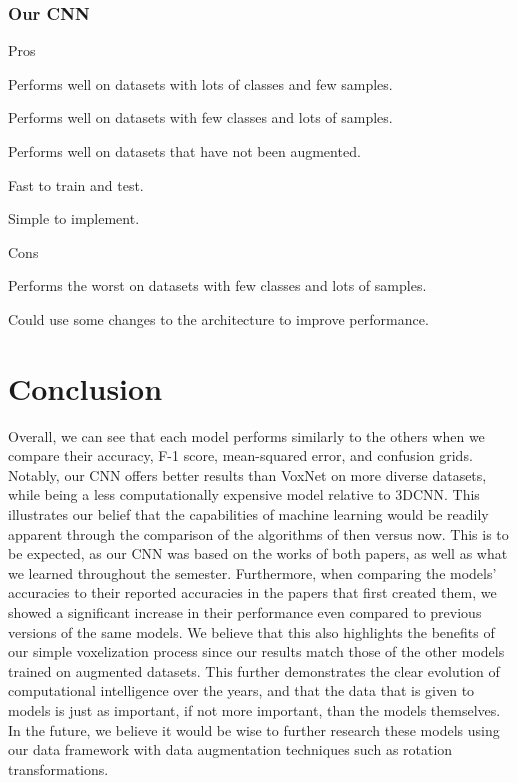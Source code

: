 \documentclass[conference]{IEEEtran}
\begin{document}
\subsubsection{Our CNN}
\begin{list}{}{\leftmargin=1em}
    \item Pros
    \begin{list}{}{\leftmargin=1em}
        \item Performs well on datasets with lots of classes and few samples.
        \item Performs well on datasets with few classes and lots of samples.
        \item Performs well on datasets that have not been augmented.
        \item Fast to train and test.
        \item Simple to implement.
    \end{list}
    \item Cons
    \begin{list}{}{\leftmargin=1em}
        \item Performs the worst on datasets with few classes and lots of samples.
        \item Could use some changes to the architecture to improve performance.
    \end{list}
\end{list}

\section{Conclusion}
Overall, we can see that each model performs similarly to the others when we compare their accuracy, F-1 score, mean-squared error, and confusion grids. Notably, our CNN offers better results than VoxNet on more diverse datasets, while being a less computationally expensive model relative to 3DCNN. This illustrates our belief that the capabilities of machine learning would be readily apparent through the comparison of the algorithms of then versus now. This is to be expected, as our CNN was based on the works of both papers, as well as what we learned throughout the semester. Furthermore, when comparing the models' accuracies to their reported accuracies in the papers that first created them, we showed a significant increase in their performance even compared to previous versions of the same models. We believe that this also highlights the benefits of our simple voxelization process since our results match those of the other models trained on augmented datasets. This further demonstrates the clear evolution of computational intelligence over the years, and that the data that is given to models is just as important, if not more important, than the models themselves. In the future, we believe it would be wise to further research these models using our data framework with data augmentation techniques such as rotation transformations.
\end{document}
